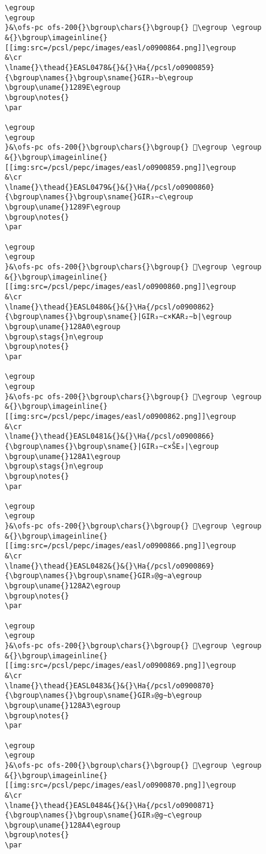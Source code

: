 \begin{verbatim}
\egroup
\egroup
}&\ofs-pc ofs-200{}\bgroup\chars{}\bgroup{} 𒢝\egroup \egroup
&{}\bgroup\imageinline{}[[img:src=/pcsl/pepc/images/easl/o0900864.png]]\egroup
&\cr
\lname{}\thead{}EASL0478&{}&{}\Ha{/pcsl/o0900859}{\bgroup\names{}\bgroup\sname{}GIR₃∼b\egroup
\bgroup\uname{}1289E\egroup
\bgroup\notes{}
\par 

\egroup
\egroup
}&\ofs-pc ofs-200{}\bgroup\chars{}\bgroup{} 𒢞\egroup \egroup
&{}\bgroup\imageinline{}[[img:src=/pcsl/pepc/images/easl/o0900859.png]]\egroup
&\cr
\lname{}\thead{}EASL0479&{}&{}\Ha{/pcsl/o0900860}{\bgroup\names{}\bgroup\sname{}GIR₃∼c\egroup
\bgroup\uname{}1289F\egroup
\bgroup\notes{}
\par 

\egroup
\egroup
}&\ofs-pc ofs-200{}\bgroup\chars{}\bgroup{} 𒢟\egroup \egroup
&{}\bgroup\imageinline{}[[img:src=/pcsl/pepc/images/easl/o0900860.png]]\egroup
&\cr
\lname{}\thead{}EASL0480&{}&{}\Ha{/pcsl/o0900862}{\bgroup\names{}\bgroup\sname{}|GIR₃∼c×KAR₂∼b|\egroup
\bgroup\uname{}128A0\egroup
\bgroup\stags{}n\egroup
\bgroup\notes{}
\par 

\egroup
\egroup
}&\ofs-pc ofs-200{}\bgroup\chars{}\bgroup{} 𒢠\egroup \egroup
&{}\bgroup\imageinline{}[[img:src=/pcsl/pepc/images/easl/o0900862.png]]\egroup
&\cr
\lname{}\thead{}EASL0481&{}&{}\Ha{/pcsl/o0900866}{\bgroup\names{}\bgroup\sname{}|GIR₃∼c×ŠE₃|\egroup
\bgroup\uname{}128A1\egroup
\bgroup\stags{}n\egroup
\bgroup\notes{}
\par 

\egroup
\egroup
}&\ofs-pc ofs-200{}\bgroup\chars{}\bgroup{} 𒢡\egroup \egroup
&{}\bgroup\imageinline{}[[img:src=/pcsl/pepc/images/easl/o0900866.png]]\egroup
&\cr
\lname{}\thead{}EASL0482&{}&{}\Ha{/pcsl/o0900869}{\bgroup\names{}\bgroup\sname{}GIR₃@g∼a\egroup
\bgroup\uname{}128A2\egroup
\bgroup\notes{}
\par 

\egroup
\egroup
}&\ofs-pc ofs-200{}\bgroup\chars{}\bgroup{} 𒢢\egroup \egroup
&{}\bgroup\imageinline{}[[img:src=/pcsl/pepc/images/easl/o0900869.png]]\egroup
&\cr
\lname{}\thead{}EASL0483&{}&{}\Ha{/pcsl/o0900870}{\bgroup\names{}\bgroup\sname{}GIR₃@g∼b\egroup
\bgroup\uname{}128A3\egroup
\bgroup\notes{}
\par 

\egroup
\egroup
}&\ofs-pc ofs-200{}\bgroup\chars{}\bgroup{} 𒢣\egroup \egroup
&{}\bgroup\imageinline{}[[img:src=/pcsl/pepc/images/easl/o0900870.png]]\egroup
&\cr
\lname{}\thead{}EASL0484&{}&{}\Ha{/pcsl/o0900871}{\bgroup\names{}\bgroup\sname{}GIR₃@g∼c\egroup
\bgroup\uname{}128A4\egroup
\bgroup\notes{}
\par 


\end{verbatim}
